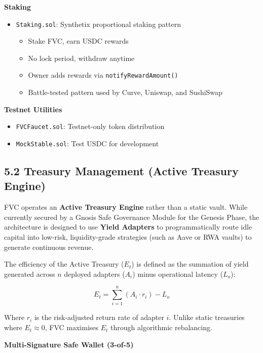 \documentclass[
  paper=a4,
  ,captions=tableheading
]{scrartcl}
\newcommand{\passthrough}[1]{#1}
\providecommand{\tightlist}{%
  \setlength{\itemsep}{0pt}\setlength{\parskip}{0pt}}
\begin{document}
\textbf{Staking}

\begin{itemize}
\tightlist
\item
  \passthrough{\lstinline!Staking.sol!}: Synthetix proportional staking pattern
  \begin{itemize}
  \tightlist
  \item
    Stake FVC, earn USDC rewards
  \item
    No lock period, withdraw anytime
  \item
    Owner adds rewards via \passthrough{\lstinline!notifyRewardAmount()!}
  \item
    Battle-tested pattern used by Curve, Uniswap, and SushiSwap
  \end{itemize}
\end{itemize}

\textbf{Testnet Utilities}

\begin{itemize}
\tightlist
\item
  \passthrough{\lstinline!FVCFaucet.sol!}: Testnet-only token distribution
\item
  \passthrough{\lstinline!MockStable.sol!}: Test USDC for development
\end{itemize}

\subsection{5.2 Treasury Management (Active Treasury Engine)}\label{treasury-management}

FVC operates an \textbf{Active Treasury Engine} rather than a static vault. While currently secured by a Gnosis Safe Governance Module for the Genesis Phase, the architecture is designed to use \textbf{Yield Adapters} to programmatically route idle capital into low-risk, liquidity-grade strategies (such as Aave or RWA vaults) to generate continuous revenue.

The efficiency of the Active Treasury ($E_t$) is defined as the summation of yield generated across $n$ deployed adapters ($A_i$) minus operational latency ($L_o$):

\[
E_t = \sum_{i=1}^{n} (A_i \cdot r_i) - L_o
\]

Where $r_i$ is the risk-adjusted return rate of adapter $i$. Unlike static treasuries where $E_t \approx 0$, FVC maximises $E_t$ through algorithmic rebalancing.

\textbf{Multi-Signature Safe Wallet (3-of-5)}
\end{document}
